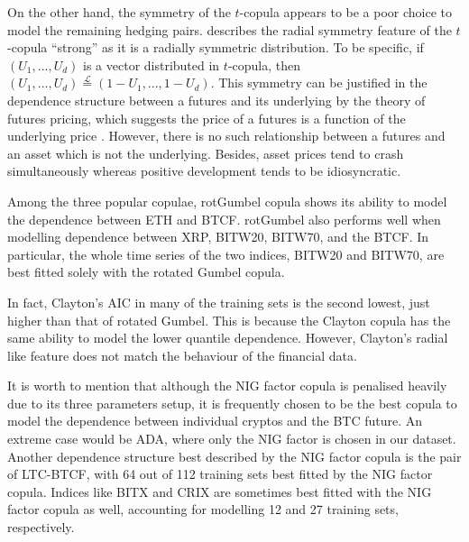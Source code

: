 On the other hand, the  symmetry of the
$t$-copula appears to be a poor choice to model the remaining hedging
pairs. 
\cite{demarta2005t} describes the radial symmetry feature of the $t$-copula ``strong'' as it is a radially symmetric distribution.
To be specific, if $(U_1, ..., U_d)$ is a vector distributed in $t$-copula,
then $(U_1, ..., U_d) \overset{\mathcal{L}}= (1-U_1, ...,
1-U_d)$.
This symmetry can be justified in the dependence structure between a
futures and its underlying by the theory of futures pricing,
which suggests the price of a futures is a function of the underlying
price \citep{hull2003options}. However, there is no such relationship
between a futures and an asset which is not the underlying. Besides,
asset prices tend to crash simultaneously whereas positive development
tends to be idiosyncratic.   

Among the three popular copulae, rotGumbel copula shows its ability to
model the dependence between ETH and BTCF. rotGumbel also performs
well when modelling dependence between XRP, BITW20, BITW70, and the
BTCF. In particular, the whole time series of the two indices, BITW20
and BITW70, are best fitted solely with the rotated Gumbel
copula.

In fact, Clayton's AIC in many of the training sets is the second
lowest, just higher than that of rotated Gumbel. This is because the
Clayton copula has the same ability to model the lower quantile
dependence. However, Clayton's radial like feature does not match the
behaviour of the financial data. 

It is worth to mention that although the NIG factor copula is
penalised heavily due to its three parameters setup, it is frequently
chosen to be the best copula to model the dependence between
individual cryptos and the BTC future. An extreme case would be ADA,
where only the NIG factor is chosen in our dataset. 
Another dependence structure best described by the NIG factor
copula is the pair of LTC-BTCF, with 64 out of 112 training sets best
fitted by the NIG factor copula. Indices like BITX and CRIX are
sometimes best fitted with the NIG factor copula as well, accounting
for modelling 12 and 27 training sets, respectively. 

